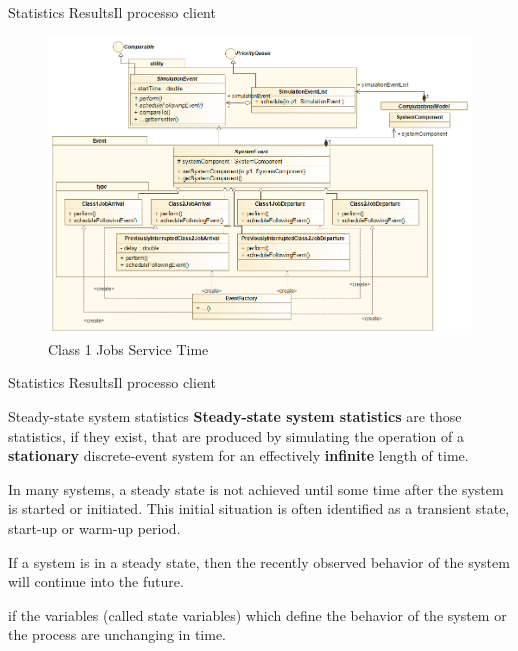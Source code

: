 \documentclass[10pt]{beamer}
\begin{document}
\begin{frame}[fragile]{Statistics Results}{Il processo client}
\begin{figure}
\centering
\includegraphics[width=\textwidth]{./images/ClassDiagramEvent.png}
\caption{Class 1 Jobs Service Time}
\label{fig:Concorrente}
\end{figure}


\end{frame}


\begin{frame}[fragile]{Statistics Results}{Il processo client}

\begin{block}{Steady-state system statistics}
\textbf{Steady-state system statistics} are those statistics, if they exist, that are produced by simulating the operation of a \textbf{stationary} discrete-event system for an effectively \textbf{infinite} length of time.

In many systems, a steady state is not achieved until some time after the system is started or initiated. This initial situation is often identified as a transient state, start-up or warm-up period.

If a system is in a steady state, then the recently observed behavior of the system will continue into the future.

if the variables (called state variables) which define the behavior of the system or the process are unchanging in time.

\end{block}
\end{frame}
\end{document}
